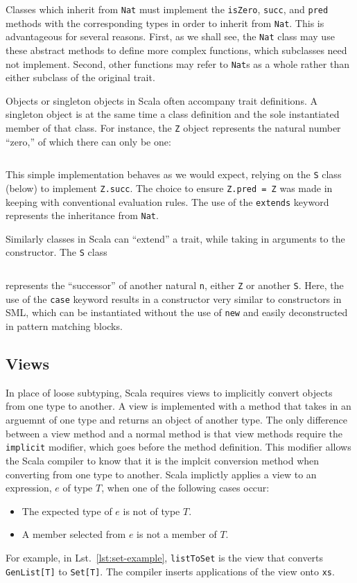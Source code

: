 \documentclass[jou,apacite]{IEEEtran}
\begin{document}
Classes which inherit from \texttt{Nat} must implement the \texttt{isZero},
\texttt{succ}, and \texttt{pred} methods with the corresponding types in order
to inherit from \texttt{Nat}. This is advantageous for several reasons. First,
as we shall see, the \texttt{Nat} class may use these abstract methods to define
more complex functions, which subclasses need not implement. Second, other
functions may refer to \texttt{Nat}s as a whole rather than either subclass of
the original trait.

Objects or singleton objects in Scala often accompany trait definitions. A
singleton object is at the same time a class definition and the sole
instantiated member of that class. For instance, the \texttt{Z} object
represents the natural number ``zero,'' of which there can only be one: %
\begin{samepage}
  \inputminted{Scala}{../examples/ExampleZero.scala} %
\end{samepage}
This simple implementation behaves as we would expect, relying on the \texttt{S}
class (below) to implement \texttt{Z.succ}. The choice to ensure \texttt{Z.pred
  = Z} was made in keeping with conventional evaluation rules. The use of the
\texttt{extends} keyword represents the inheritance from \texttt{Nat}.

Similarly classes in Scala can ``extend'' a trait, while taking in arguments to
the constructor. The \texttt{S} class %
\begin{samepage}
  \inputminted{Scala}{../examples/ExampleSucc.scala} %
\end{samepage}
represents the ``successor'' of another natural \texttt{n}, either \texttt{Z} or
another \texttt{S}. Here, the use of the \texttt{case} keyword results in a
constructor very similar to constructors in SML, which can be instantiated
without the use of \texttt{new} and easily deconstructed in pattern matching
blocks.

\subsection{Views}
\label{sec:views}

In place of loose subtyping, Scala requires views to implicitly convert objects
from one type to another. A view is implemented with a method that takes in an
arguemnt of one type and returns an object of another type. The only difference
between a view method and a normal method is that view methods require the
\texttt{implicit} modifier, which goes before the method definition. This
modifier allows the Scala compiler to know that it is the implcit conversion
method when converting from one type to another. Scala implictly applies a view
to an expression, $e$ of type $T$, when one of the following cases occur:
\begin{itemize}
\item The expected type of $e$ is not of type $T$.
\item A member selected from $e$ is not a member of $T$.
\end{itemize}  
For example, in Lst.~\ref{lst:set-example}, \texttt{listToSet} is the view that converts \texttt{GenList[T]} to \texttt{Set[T]}. The compiler inserts applications of the view onto \texttt{xs}.
\end{document}
